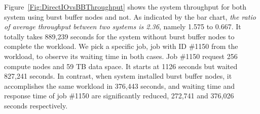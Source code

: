
Figure~\ref{Fig:DirectIOvsBBThroughput} shows the system throughput for
both system using burst buffer nodes and not.
As indicated by the bar chart,
\textit{the ratio of average throughput between two systems is 2.36},
namely 1.575 to 0.667.
It totally takes 889,239 seconds for the system without burst buffer nodes to
complete the workload.
We pick a specific job, job with ID \#1150 from the workload, to observe its
waiting time in both cases.
Job \#1150 request 256 compute nodes and 59 TB data space.
It starts at 1126 seconds but waited 827,241 seconds.
In contrast, when system installed burst buffer nodes,
it accomplishes the same workload in 376,443 seconds, and waiting time and response time of job \#1150
are significantly reduced, 272,741 and 376,026 seconds respectively.


